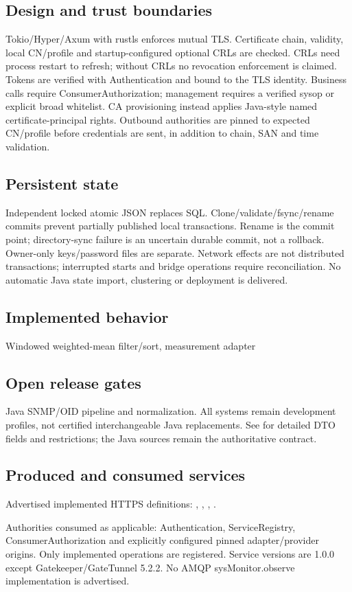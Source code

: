 \documentclass[a4paper]{arrowhead}
\begin{document}
\subsection{Design and trust boundaries}
Tokio/Hyper/Axum with rustls enforces mutual TLS. Certificate chain, validity, local CN/profile and startup-configured optional CRLs are checked. CRLs need process restart to refresh; without CRLs no revocation enforcement is claimed. Tokens are verified with Authentication and bound to the TLS identity. Business calls require ConsumerAuthorization; management requires a verified sysop or explicit broad whitelist. CA provisioning instead applies Java-style named certificate-principal rights. Outbound authorities are pinned to expected CN/profile before credentials are sent, in addition to chain, SAN and time validation.
\subsection{Persistent state}
Independent locked atomic JSON replaces SQL. Clone/validate/fsync/rename commits prevent partially published local transactions. Rename is the commit point; directory-sync failure is an uncertain durable commit, not a rollback. Owner-only keys/password files are separate. Network effects are not distributed transactions; interrupted starts and bridge operations require reconciliation. No automatic Java state import, clustering or deployment is delivered.
\subsection{Implemented behavior}
Windowed weighted-mean filter/sort, measurement adapter
\subsection{Open release gates}
Java SNMP/OID pipeline and normalization. All systems remain development profiles, not certified interchangeable Java replacements. See  for detailed DTO fields and restrictions; the Java sources remain the authoritative contract.
\subsection{Produced and consumed services}
Advertised implemented HTTPS definitions: , \allowbreak {}, \allowbreak {}, \allowbreak {}.\par
Authorities consumed as applicable: Authentication, ServiceRegistry, ConsumerAuthorization and explicitly configured pinned adapter/provider origins. Only implemented operations are registered. Service versions are 1.0.0 except Gatekeeper/GateTunnel 5.2.2. No AMQP sysMonitor.observe implementation is advertised.
\clearpage
\end{document}
